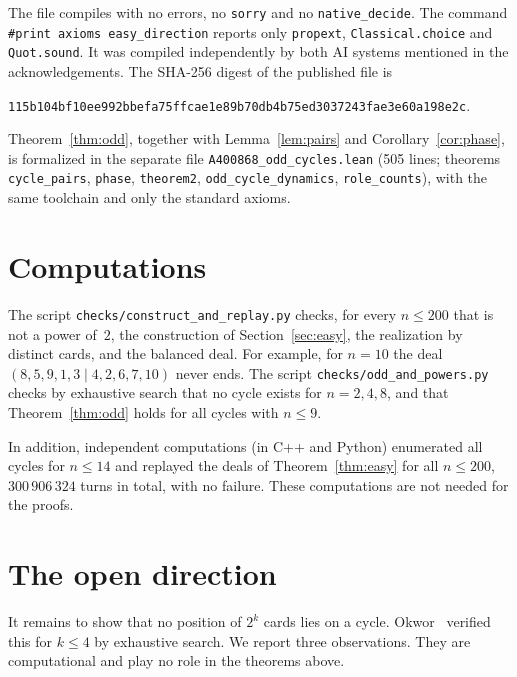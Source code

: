 \documentclass[11pt,a4paper]{amsart}
\theoremstyle{definition}
\theoremstyle{remark}
\begin{document}
The file compiles with no errors, no \texttt{sorry} and no \texttt{native\_decide}. The command \texttt{\#print axioms easy\_direction} reports only \texttt{propext}, \texttt{Classical.choice} and \texttt{Quot.sound}. It was compiled independently by both AI systems mentioned in the acknowledgements. The SHA-256 digest of the published file is
\begin{center}\small\texttt{115b104bf10ee992bbefa75ffcae1e89b70db4b75ed3037243fae3e60a198e2c}.\end{center}
Theorem~\ref{thm:odd}, together with Lemma~\ref{lem:pairs} and Corollary~\ref{cor:phase}, is formalized in the separate file \texttt{A400868\_odd\_cycles.lean} (505 lines; theorems \texttt{cycle\_pairs}, \texttt{phase}, \texttt{theorem2}, \texttt{odd\_cycle\_dynamics}, \texttt{role\_counts}), with the same toolchain and only the standard axioms.

\section{Computations}\label{sec:comp}

The script \texttt{checks/construct\_and\_replay.py} checks, for every $n\le200$ that is not a power of~$2$, the construction of Section~\ref{sec:easy}, the realization by distinct cards, and the balanced deal. For example, for $n=10$ the deal $(8,5,9,1,3\mid4,2,6,7,10)$ never ends. The script \texttt{checks/odd\_and\_powers.py} checks by exhaustive search that no cycle exists for $n=2,4,8$, and that Theorem~\ref{thm:odd} holds for all cycles with $n\le9$.

In addition, independent computations (in C++ and Python) enumerated all cycles for $n\le14$ and replayed the deals of Theorem~\ref{thm:easy} for all $n\le200$, $300\,906\,324$ turns in total, with no failure. These computations are not needed for the proofs.

\section{The open direction}\label{sec:hard}

It remains to show that no position of $2^k$ cards lies on a cycle. Okwor~\cite{Okwor} verified this for $k\le4$ by exhaustive search. We report three observations. They are computational and play no role in the theorems above.
\end{document}
